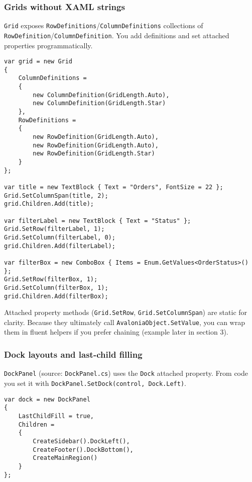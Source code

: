 \subsubsection{Grids without XAML
strings}\label{grids-without-xaml-strings}

\passthrough{\lstinline!Grid!} exposes
\passthrough{\lstinline!RowDefinitions!}/\passthrough{\lstinline!ColumnDefinitions!}
collections of
\passthrough{\lstinline!RowDefinition!}/\passthrough{\lstinline!ColumnDefinition!}.
You add definitions and set attached properties programmatically.

\begin{lstlisting}
var grid = new Grid
{
    ColumnDefinitions =
    {
        new ColumnDefinition(GridLength.Auto),
        new ColumnDefinition(GridLength.Star)
    },
    RowDefinitions =
    {
        new RowDefinition(GridLength.Auto),
        new RowDefinition(GridLength.Auto),
        new RowDefinition(GridLength.Star)
    }
};

var title = new TextBlock { Text = "Orders", FontSize = 22 }; 
Grid.SetColumnSpan(title, 2);
grid.Children.Add(title);

var filterLabel = new TextBlock { Text = "Status" };
Grid.SetRow(filterLabel, 1);
Grid.SetColumn(filterLabel, 0);
grid.Children.Add(filterLabel);

var filterBox = new ComboBox { Items = Enum.GetValues<OrderStatus>() };
Grid.SetRow(filterBox, 1);
Grid.SetColumn(filterBox, 1);
grid.Children.Add(filterBox);
\end{lstlisting}

Attached property methods (\passthrough{\lstinline!Grid.SetRow!},
\passthrough{\lstinline!Grid.SetColumnSpan!}) are static for clarity.
Because they ultimately call
\passthrough{\lstinline!AvaloniaObject.SetValue!}, you can wrap them in
fluent helpers if you prefer chaining (example later in section 3).

\subsubsection{Dock layouts and last-child
filling}\label{dock-layouts-and-last-child-filling}

\passthrough{\lstinline!DockPanel!} (source:
\passthrough{\lstinline!DockPanel.cs!}) uses the
\passthrough{\lstinline!Dock!} attached property. From code you set it
with \passthrough{\lstinline!DockPanel.SetDock(control, Dock.Left)!}.

\begin{lstlisting}
var dock = new DockPanel
{
    LastChildFill = true,
    Children =
    {
        CreateSidebar().DockLeft(),
        CreateFooter().DockBottom(),
        CreateMainRegion()
    }
};
\end{lstlisting}

